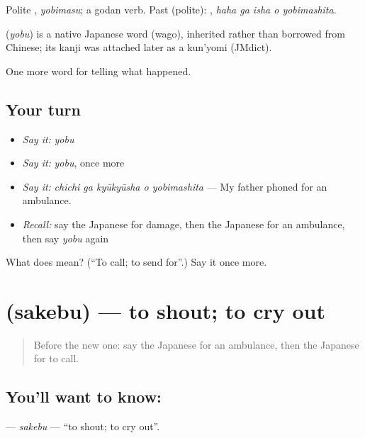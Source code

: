 Polite \textbf{}, \emph{yobimasu}; a godan verb. Past (polite): \textbf{  }, \emph{haha ga isha o yobimashita}.

\begin{cousinweb}
\textbf{} (\emph{yobu}) is a native Japanese word (wago), inherited rather than borrowed from Chinese; its kanji was attached later as a kun'yomi (JMdict).
\end{cousinweb}

\begin{grammarlens}[title={What you've built}]
One more word for telling what happened.
\end{grammarlens}

\subsection*{Your turn}
\begin{itemize}
\raggedright
  \item \emph{Say it:} \emph{yobu}
  \item \emph{Say it:} \emph{yobu}, once more
  \item \emph{Say it:} \emph{chichi ga kyūkyūsha o yobimashita} — My father phoned for an ambulance.
  \item \emph{Recall:} say the Japanese for damage, then the Japanese for an ambulance, then say \emph{yobu} again
\end{itemize}

\begin{tcolorbox}[breakable,colback=teal!4,colframe=teal!35!black,title={Before you move on}]
What does  mean? (\textquotedblleft{}To call; to send for\textquotedblright{}.) Say it once more.
\end{tcolorbox}
\section[\texorpdfstring{\ja{さけぶ} (sakebu)}{さけぶ (sakebu)}]{ (sakebu) — to shout; to cry out}

\label{lesson:JA-C263-sakebu}



\begin{quote}
Before the new one: say the Japanese for an ambulance, then the Japanese for to call.
\end{quote}

\subsection*{You'll want to know: }
\textbf{} — \emph{sakebu} — \textquotedblleft{}to shout; to cry out\textquotedblright{}.

